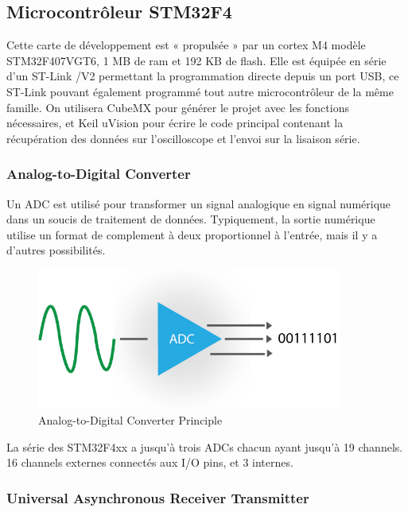 \documentclass[11pt, french]{article}
\begin{document}
\subsection{Microcontrôleur STM32F4}

Cette carte de développement est « propulsée » par un cortex M4 modèle STM32F407VGT6, 1 MB de ram et 192 KB de flash.
Elle est équipée en série d’un ST-Link /V2 permettant la programmation directe depuis un port USB, ce ST-Link pouvant également programmé tout autre microcontrôleur de la même famille.
On utilisera CubeMX pour générer le projet avec les fonctions nécessaires, et Keil uVision pour écrire le code principal contenant la récupération des données sur l'oscilloscope et l'envoi sur la lisaison série.

\subsubsection{Analog-to-Digital Converter}

Un ADC est utilisé pour transformer un signal analogique en signal numérique dans un soucis de traitement de données. Typiquement, la sortie numérique utilise un format de complement à deux proportionnel à l'entrée, mais il y a d'autres possibilités.

\vspace*{0.1cm}
\begin{figure}[htb]
\centering
\includegraphics[width=10cm]{ADC-1.png}
\caption{Analog-to-Digital Converter Principle}
\label{fig:adc}
\end{figure}
\vspace*{0.1cm}

La série des STM32F4xx a jusqu'à trois ADCs chacun ayant jusqu'à 19 channels. 16 channels externes connectés aux I/O pins, et 3 internes.

\newpage

\subsubsection{Universal Asynchronous Receiver Transmitter}
\end{document}
